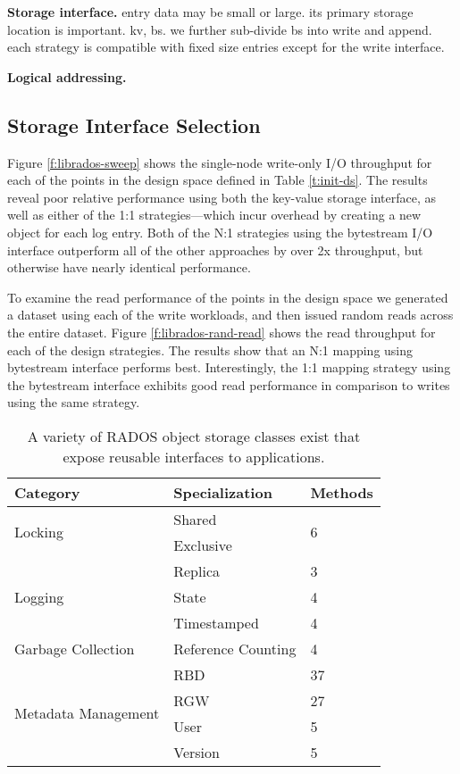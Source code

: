 \documentclass[10pt,twocolumn]{article}
\begin{document}
{\bf Storage interface.} entry data may be small or large. its primary
storage location is important. kv, bs. we further sub-divide bs into
write and append. each strategy is compatible with fixed size entries
except for the write interface.

{\bf Logical addressing.}

\subsection{Storage Interface Selection}

Figure \ref{f:librados-sweep} shows the single-node write-only I/O throughput
for each of the points in the design space defined in Table \ref{t:init-ds}.
The results reveal poor relative performance using both the key-value storage
interface, as well as either of the 1:1 strategies---which incur overhead by
creating a new object for each log entry. Both of the N:1 strategies using the
bytestream I/O interface outperform all of the other approaches by over 2x
throughput, but otherwise have nearly identical performance.

To examine the read performance of the points in the design space we generated
a dataset using each of the write workloads, and then issued random reads
across the entire dataset. Figure \ref{f:librados-rand-read} shows the read
throughput for each of the design strategies. The results show that an N:1
mapping using bytestream interface performs best. Interestingly, the 1:1
mapping strategy using the bytestream interface exhibits good read performance
in comparison to writes using the same strategy.

\begin{table}
\begin{tabular}{|l|l|l|}
\hline
Category & Specialization & Methods \\ \hline
\multirow{2}{*}{Locking} & Shared & \multirow{2}{*}{6} \\
                         & Exclusive & \\ \hline
\multirow{3}{*}{Logging} & Replica & 3 \\
                         & State & 4 \\
                         & Timestamped & 4 \\ \hline
Garbage Collection & Reference Counting & 4 \\ \hline
\multirow{4}{*}{Metadata Management} & RBD & 37 \\
 & RGW & 27 \\
 & User & 5 \\
 & Version & 5 \\ \hline
\end{tabular}
\caption{A variety of RADOS object storage classes exist that expose reusable interfaces to applications.}
\label{tab:objclasses}
\end{table}
\end{document}
